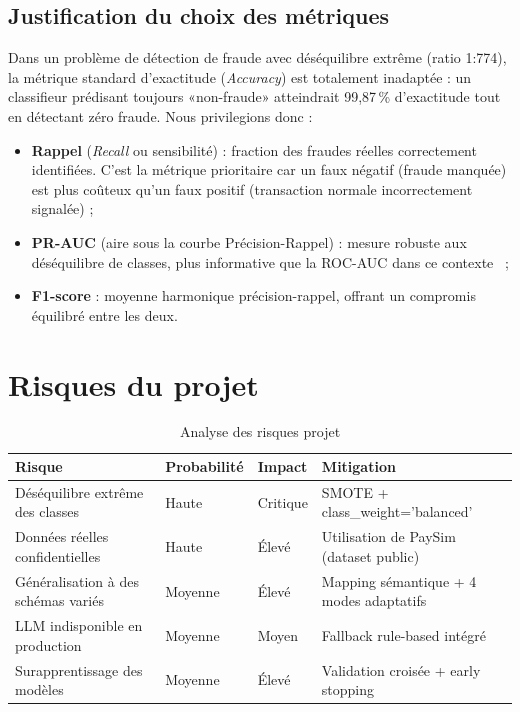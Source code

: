 \documentclass[12pt,a4paper,twoside]{report}
\theoremstyle{definition}
\begin{document}
\subsection{Justification du choix des métriques}

Dans un problème de détection de fraude avec déséquilibre extrême (ratio 1:774),
la métrique standard d'exactitude (\textit{Accuracy}) est totalement inadaptée :
un classifieur prédisant toujours «non-fraude» atteindrait 99,87\,\% d'exactitude
tout en détectant zéro fraude. Nous privilegions donc :

\begin{itemize}
  \item \textbf{Rappel} (\textit{Recall} ou sensibilité) : fraction des fraudes
    réelles correctement identifiées. C'est la métrique prioritaire car un faux
    négatif (fraude manquée) est plus coûteux qu'un faux positif (transaction normale
    incorrectement signalée) ;
  \item \textbf{PR-AUC} (aire sous la courbe Précision-Rappel) : mesure robuste
    aux déséquilibre de classes, plus informative que la ROC-AUC dans ce contexte~\cite{davis2006relationship} ;
  \item \textbf{F1-score} : moyenne harmonique précision-rappel, offrant un compromis
    équilibré entre les deux.
\end{itemize}

\section{Risques du projet}

\begin{table}[H]
\centering
\caption{Analyse des risques projet}
\label{tab:risks}
\renewcommand{\arraystretch}{1.3}
\begin{tabularx}{\textwidth}{L{3.5cm}C{1.5cm}C{1.5cm}L{5.5cm}}
\toprule
\textbf{Risque} & \textbf{Probabilité} & \textbf{Impact} & \textbf{Mitigation} \\
\midrule
Déséquilibre extrême des classes & Haute & Critique & SMOTE + class\_weight='balanced' \\
Données réelles confidentielles & Haute & Élevé & Utilisation de PaySim (dataset public) \\
Généralisation à des schémas variés & Moyenne & Élevé & Mapping sémantique + 4 modes adaptatifs \\
LLM indisponible en production & Moyenne & Moyen & Fallback rule-based intégré \\
Surapprentissage des modèles & Moyenne & Élevé & Validation croisée + early stopping \\
\bottomrule
\end{tabularx}
\end{table}
\end{document}
